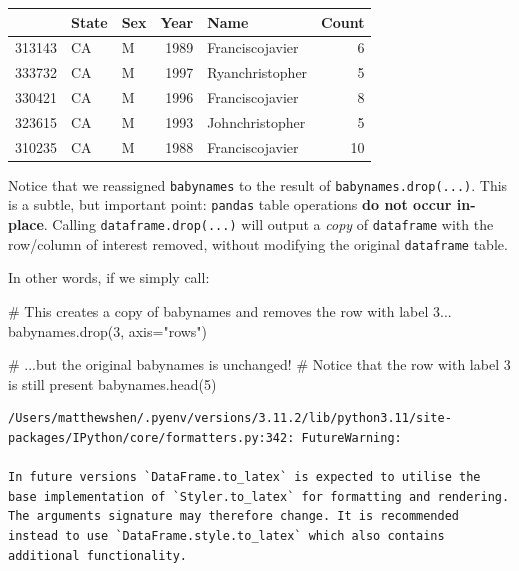 \documentclass[
  letterpaper,
  DIV=11,
  numbers=noendperiod]{scrreprt}
\newenvironment{Shaded}{\begin{snugshade}}{\end{snugshade}}
\newcommand{\CommentTok}[1]{\textcolor[rgb]{0.37,0.37,0.37}{#1}}
\newcommand{\DecValTok}[1]{\textcolor[rgb]{0.68,0.00,0.00}{#1}}
\newcommand{\NormalTok}[1]{\textcolor[rgb]{0.00,0.23,0.31}{#1}}
\newcommand{\OperatorTok}[1]{\textcolor[rgb]{0.37,0.37,0.37}{#1}}
\newcommand{\StringTok}[1]{\textcolor[rgb]{0.13,0.47,0.30}{#1}}
\begin{document}
\begin{tabular}{lllrlr}
\toprule
{} & State & Sex &  Year &             Name &  Count \\
\midrule
313143 &    CA &   M &  1989 &  Franciscojavier &      6 \\
333732 &    CA &   M &  1997 &  Ryanchristopher &      5 \\
330421 &    CA &   M &  1996 &  Franciscojavier &      8 \\
323615 &    CA &   M &  1993 &  Johnchristopher &      5 \\
310235 &    CA &   M &  1988 &  Franciscojavier &     10 \\
\bottomrule
\end{tabular}

Notice that we reassigned \texttt{babynames} to the result of
\texttt{babynames.drop(...)}. This is a subtle, but important point:
\texttt{pandas} table operations \textbf{do not occur in-place}. Calling
\texttt{dataframe.drop(...)} will output a \emph{copy} of
\texttt{dataframe} with the row/column of interest removed, without
modifying the original \texttt{dataframe} table.

In other words, if we simply call:

\begin{Shaded}
\begin{Highlighting}[]
\CommentTok{\# This creates a copy of \textasciigrave{}babynames\textasciigrave{} and removes the row with label 3...}
\NormalTok{babynames.drop(}\DecValTok{3}\NormalTok{, axis}\OperatorTok{=}\StringTok{"rows"}\NormalTok{)}

\CommentTok{\# ...but the original \textasciigrave{}babynames\textasciigrave{} is unchanged! }
\CommentTok{\# Notice that the row with label 3 is still present}
\NormalTok{babynames.head(}\DecValTok{5}\NormalTok{)}
\end{Highlighting}
\end{Shaded}

\begin{verbatim}
/Users/matthewshen/.pyenv/versions/3.11.2/lib/python3.11/site-packages/IPython/core/formatters.py:342: FutureWarning:

In future versions `DataFrame.to_latex` is expected to utilise the base implementation of `Styler.to_latex` for formatting and rendering. The arguments signature may therefore change. It is recommended instead to use `DataFrame.style.to_latex` which also contains additional functionality.
\end{verbatim}
\end{document}
